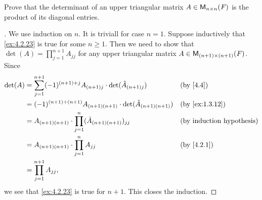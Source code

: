 \exercisesection

\setcounter{ex}{22}
\begin{ex}\label{ex:4.2.23}
  Prove that the determinant of an upper triangular matrix \(A \in \mathsf{M}_{{n} \times n}({\mathit{F}})\) is the product of its diagonal entries.
\end{ex}

\begin{proof}[]
  We use induction on \(n\).
  It is triviall for case \(n = 1\).
  Suppose inductively that \cref{ex:4.2.23} is true for some \(n \geq 1\).
  Then we need to show that \(\det(A) = \prod_{j = 1}^{n + 1} A_{j j}\) for any upper triangular matrix \(A \in \mathsf{M}_{{(n + 1)} \times (n + 1)}({\mathit{F}})\).
  Since
  \begin{align*}
    \det(A) & = \sum_{j = 1}^{n + 1} (-1)^{(n + 1) + j} A_{(n + 1) j} \cdot \det(\tilde{A}_{(n + 1) j}) &  & \text{(by \cref{4.4})}           \\
            & = (-1)^{(n + 1) + (n + 1)} A_{(n + 1) (n + 1)} \cdot \det(\tilde{A}_{(n + 1) (n + 1)})    &  & \text{(by \cref{ex:1.3.12})}     \\
            & = A_{(n + 1) (n + 1)} \cdot \prod_{j = 1}^n (\tilde{A}_{(n + 1) (n + 1)})_{j j}           &  & \text{(by induction hypothesis)} \\
            & = A_{(n + 1) (n + 1)} \cdot \prod_{j = 1}^n A_{j j}                                       &  & \text{(by \cref{4.2.1})}         \\
            & = \prod_{j = 1}^{n + 1} A_{j j},
  \end{align*}
  we see that \cref{ex:4.2.23} is true for \(n + 1\).
  This closes the induction.
\end{proof}
